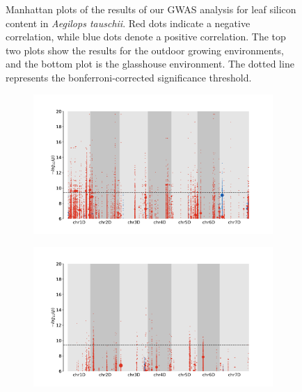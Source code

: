\documentclass[12pt, letterpaper, ]{report}
\begin{document}
\begin{figure}[h]
\begin{subfigure}[b]{\textwidth}
                \label{Fig:gh_si_peak}
        \end{subfigure}
        \caption{Manhattan plots of the results of our GWAS analysis for leaf silicon content in \textit{Aegilops tauschii}. Red dots indicate a negative correlation, while blue dots denote a positive correlation. The top two plots show the results for the outdoor growing environments, and the bottom plot is the glasshouse environment. The dotted line represents the bonferroni-corrected significance threshold.}
        \label{Fig:si_peak_plot}
\end{figure}

\begin{figure}[h]
        \centering
        \begin{subfigure}[b]{\textwidth}
                \centering
                \includegraphics[scale=0.3]{images/gwas_plots/svgtopng/tf_mn_plot.png}
                \label{Fig:tf_mn_peak}
        \end{subfigure}
        \begin{subfigure}[b]{\textwidth}
                \centering
                \includegraphics[scale=0.3]{images/gwas_plots/svgtopng/sc_mn_plot.png}

\end{subfigure}
\end{figure}
\end{document}
